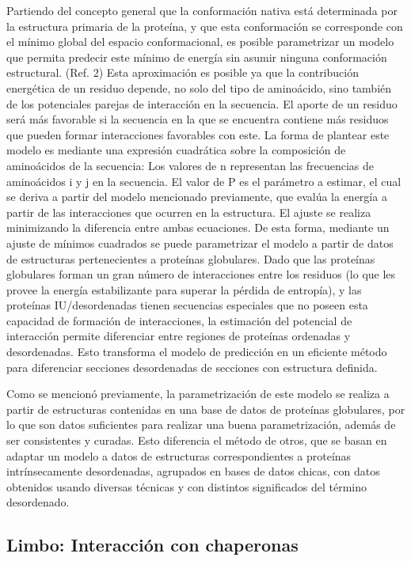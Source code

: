 Partiendo del concepto general que la conformación nativa está determinada por la estructura primaria de la proteína, y que esta conformación se corresponde con el mínimo global del
espacio conformacional, es posible parametrizar un modelo que permita predecir este mínimo de energía sin asumir ninguna conformación estructural. (Ref. 2)
Esta aproximación es posible ya que la contribución energética de un residuo depende, no solo del tipo de aminoácido, sino también de los potenciales parejas de interacción en la secuencia. 
El aporte de un residuo será más favorable si la secuencia en la que se encuentra contiene más residuos que pueden formar interacciones favorables con este. 
La forma de plantear este modelo es mediante una expresión cuadrática sobre la composición de aminoácidos de la secuencia:
Los valores de n representan las frecuencias de aminoácidos i y j en la secuencia.
El valor de P es el parámetro a estimar, el cual se deriva a partir del modelo mencionado previamente, que evalúa la energía a partir de las interacciones que ocurren en la estructura. 
El ajuste se realiza minimizando la diferencia entre ambas ecuaciones.
De esta forma, mediante un ajuste de mínimos cuadrados se puede parametrizar el modelo a partir de datos de estructuras pertenecientes a proteínas globulares.
Dado que las proteínas globulares forman un gran número de interacciones entre los residuos (lo que les provee la energía estabilizante para superar la pérdida de entropía), 
y las proteínas IU/desordenadas tienen secuencias especiales que no poseen esta capacidad de formación de interacciones, la estimación del potencial de interacción permite diferenciar entre 
regiones de proteínas ordenadas y desordenadas. Esto transforma el modelo de predicción en un eficiente método para diferenciar secciones desordenadas de secciones con estructura definida.

Como se mencionó previamente, la parametrización de este modelo se realiza a partir de estructuras contenidas en una base de datos de proteínas globulares, 
por lo que son datos suficientes para realizar una buena parametrización, además de ser consistentes y curadas. Esto diferencia el método de otros, que se basan en adaptar 
un modelo a datos de estructuras correspondientes a proteínas intrínsecamente desordenadas, agrupados en bases de datos chicas, con datos obtenidos usando diversas técnicas 
y con distintos significados del término desordenado.
  
  
  
  

\subsection{Limbo: Interacción con chaperonas}

